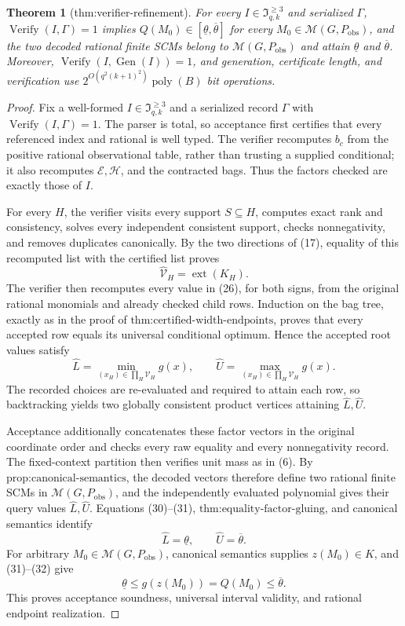 \documentclass{article}
\newtheorem{theorem}{Theorem}
\begin{document}
\begin{theorem}[thm:verifier-refinement]\label{thm:verifier-refinement}
For every \(I\in\mathfrak I_{q,k}^{\ge3}\) and serialized \(\Gamma\), \(\operatorname{Verify}(I,\Gamma)=1\) implies \(Q(M_0)\in[\underline\theta,\overline\theta]\) for every \(M_0\in\mathcal M(G,P_{\mathrm{obs}})\), and the two decoded rational finite SCMs belong to \(\mathcal M(G,P_{\mathrm{obs}})\) and attain \(\underline\theta\) and \(\overline\theta\). Moreover, \(\operatorname{Verify}(I,\operatorname{Gen}(I))=1\), and generation, certificate length, and verification use \(2^{O(q^2(k+1)^2)}\operatorname{poly}(B)\) bit operations.
\end{theorem}
\begin{proof}
Fix a well-formed \(I\in\mathfrak I_{q,k}^{\ge3}\) and a serialized record \(\Gamma\) with \(\operatorname{Verify}(I,\Gamma)=1\).  The parser is total, so acceptance first certifies that every referenced index and rational is well typed.  The verifier recomputes \(b_c\) from the positive rational observational table, rather than trusting a supplied conditional; it also recomputes \(\mathcal E,\mathcal H\), and the contracted bags.  Thus the factors checked are exactly those of \(I\).

For every \(H\), the verifier visits every support \(S\subseteq H\), computes exact rank and consistency, solves every independent consistent support, checks nonnegativity, and removes duplicates canonically.  By the two directions of (17), equality of this recomputed list with the certified list proves
\[
\widehat{\mathcal V}_H=\operatorname{ext}(K_H). \tag{30}
\]
The verifier then recomputes every value in (26), for both signs, from the original rational monomials and already checked child rows.  Induction on the bag tree, exactly as in the proof of \(\text{thm:certified-width-endpoints}\), proves that every accepted row equals its universal conditional optimum.  Hence the accepted root values satisfy
\[
\widehat L=\min_{(x_H)\in\prod_H\mathcal V_H}g(x),
\qquad
\widehat U=\max_{(x_H)\in\prod_H\mathcal V_H}g(x). \tag{31}
\]
The recorded choices are re-evaluated and required to attain each row, so backtracking yields two globally consistent product vertices attaining \(\widehat L,\widehat U\).

Acceptance additionally concatenates these factor vectors in the original coordinate order and checks every raw equality and every nonnegativity record.  The fixed-context partition then verifies unit mass as in (6).  By \(\text{prop:canonical-semantics}\), the decoded vectors therefore define two rational finite SCMs in \(\mathcal M(G,P_{\mathrm{obs}})\), and the independently evaluated polynomial gives their query values \(\widehat L,\widehat U\).  Equations (30)--(31), \(\text{thm:equality-factor-gluing}\), and canonical semantics identify
\[
\widehat L=\underline\theta,\qquad \widehat U=\overline\theta. \tag{32}
\]
For arbitrary \(M_0\in\mathcal M(G,P_{\mathrm{obs}})\), canonical semantics supplies \(z(M_0)\in K\), and (31)--(32) give
\[
\underline\theta\le g(z(M_0))=Q(M_0)\le\overline\theta. \tag{33}
\]
This proves acceptance soundness, universal interval validity, and rational endpoint realization.


\end{proof}
\end{document}
